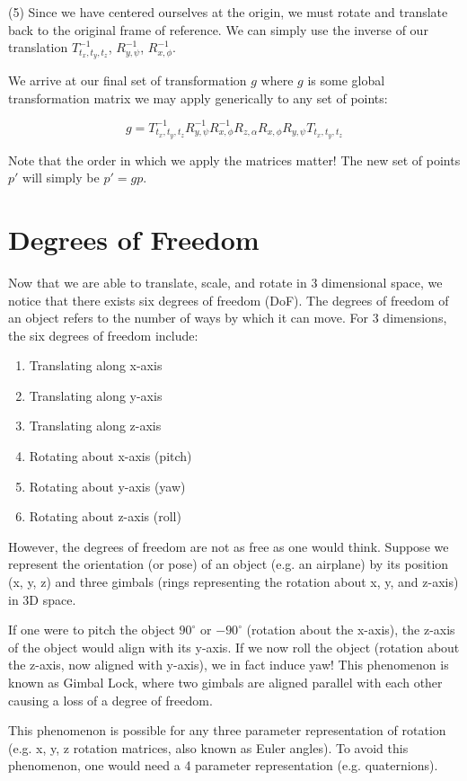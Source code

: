 \documentclass[12pt,letterpaper]{article}
\begin{document}
(5) Since we have centered ourselves at the origin, we must rotate and translate back to the original frame of reference. We can simply use the inverse of our translation $T^{-1}_{t_x, t_y, t_z}$, $R^{-1}_{y, \psi}$, $R^{-1}_{x, \phi}$.

We arrive at our final set of transformation $g$ where $g$ is some global transformation matrix we may apply generically to any set of points:

\begin{equation}
    g = T^{-1}_{t_x, t_y, t_z}
        R^{-1}_{y, \psi}
        R^{-1}_{x, \phi}
        R_{z, \alpha}
        R_{x, \phi}
        R_{y, \psi}
        T_{t_x, t_y, t_z}
\end{equation}

Note that the order in which we apply the matrices matter! The new set of points $p'$ will simply be $p' = gp$.

\section{Degrees of Freedom}
Now that we are able to translate, scale, and rotate in 3 dimensional space, we notice that there exists six degrees of freedom (DoF). The degrees of freedom of an object refers to the number of ways by which it can move. For 3 dimensions, the six degrees of freedom include:

\begin{enumerate}
    \item Translating along x-axis
    \item Translating along y-axis
    \item Translating along z-axis
    \item Rotating about x-axis (pitch)
    \item Rotating about y-axis (yaw)
    \item Rotating about z-axis (roll)
\end{enumerate}

However, the degrees of freedom are not as free as one would think. Suppose we represent the orientation (or pose) of an object (e.g. an airplane) by its position (x, y, z) and three gimbals (rings representing the rotation about x, y, and z-axis) in 3D space.

If one were to pitch the object $90^\circ$ or $-90^\circ$ (rotation about the x-axis), the z-axis of the object would align with its y-axis. If we now roll the object (rotation about the z-axis, now aligned with y-axis), we in fact induce yaw! This phenomenon is known as Gimbal Lock, where two gimbals are aligned parallel with each other causing a loss of a degree of freedom.

This phenomenon is possible for any three parameter representation of rotation (e.g. x, y, z rotation matrices, also known as Euler angles). To avoid this phenomenon, one would need a 4 parameter representation (e.g. quaternions).
\end{document}
